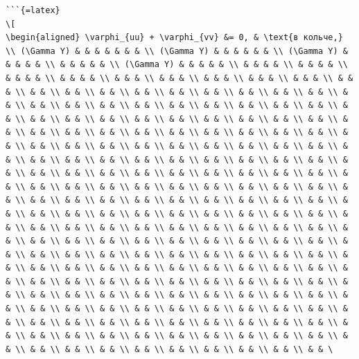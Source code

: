 \documentclass[
]{article}
\begin{document}
\begin{verbatim}
```{=latex}
\[
\begin{aligned} \varphi_{uu} + \varphi_{vv} &= 0, & \text{в кольче,} \\ (\Gamma Y) & & & & & & & \\ (\Gamma Y) & & & & & & \\ (\Gamma Y) & & & & & \\ & & & & & \\ (\Gamma Y) & & & & & \\ & & & & \\ & & & & \\ & & & & \\ & & & & \\ & & & \\ & & & \\ & & & \\ & & & \\ & & & \\ & & & \\ & & \\ & & \\ & & \\ & & \\ & & \\ & & \\ & & \\ & & \\ & & \\ & & \\ & & \\ & & \\ & & \\ & & \\ & & \\ & & \\ & & \\ & & \\ & & \\ & & \\ & & \\ & & \\ & & \\ & & \\ & & \\ & & \\ & & \\ & & \\ & & \\ & & \\ & & \\ & & \\ & & \\ & & \\ & & \\ & & \\ & & \\ & & \\ & & \\ & & \\ & & \\ & & \\ & & \\ & & \\ & & \\ & & \\ & & \\ & & \\ & & \\ & & \\ & & \\ & & \\ & & \\ & & \\ & & \\ & & \\ & & \\ & & \\ & & \\ & & \\ & & \\ & & \\ & & \\ & & \\ & & \\ & & \\ & & \\ & & \\ & & \\ & & \\ & & \\ & & \\ & & \\ & & \\ & & \\ & & \\ & & \\ & & \\ & & \\ & & \\ & & \\ & & \\ & & \\ & & \\ & & \\ & & \\ & & \\ & & \\ & & \\ & & \\ & & \\ & & \\ & & \\ & & \\ & & \\ & & \\ & & \\ & & \\ & & \\ & & \\ & & \\ & & \\ & & \\ & & \\ & & \\ & & \\ & & \\ & & \\ & & \\ & & \\ & & \\ & & \\ & & \\ & & \\ & & \\ & & \\ & & \\ & & \\ & & \\ & & \\ & & \\ & & \\ & & \\ & & \\ & & \\ & & \\ & & \\ & & \\ & & \\ & & \\ & & \\ & & \\ & & \\ & & \\ & & \\ & & \\ & & \\ & & \\ & & \\ & & \\ & & \\ & & \\ & & \\ & & \\ & & \\ & & \\ & & \\ & & \\ & & \\ & & \\ & & \\ & & \\ & & \\ & & \\ & & \\ & & \\ & & \\ & & \\ & & \\ & & \\ & & \\ & & \\ & & \\ & & \\ & & \\ & & \\ & & \\ & & \\ & & \\ & & \\ & & \\ & & \\ & & \\ & & \\ & & \\ & & \\ & & \\ & & \\ & & \\ & & \\ & & \\ & & \\ & & \\ & & \\ & & \\ & & \\ & & \\ & & \\ & & \\ & & \\ & & \\ & & \\ & & \\ & & \\ & & \\ & & \\ & & \\ & & \\ & & \
\end{verbatim}
\end{document}
